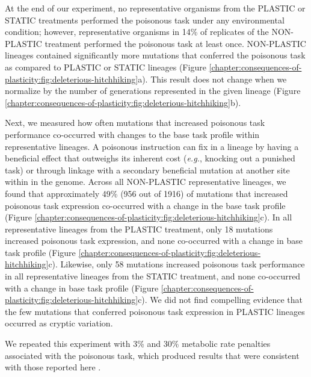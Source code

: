 

\vspace{\baselineskip}
At the end of our experiment, no representative organisms from the PLASTIC or STATIC treatments performed the poisonous task under any environmental condition; however, representative organisms in 14\% of replicates of the NON-PLASTIC treatment performed the poisonous task at least once. 
NON-PLASTIC lineages contained significantly more mutations that conferred the poisonous task as compared to PLASTIC or STATIC lineages (Figure \ref{chapter:consequences-of-plasticity:fig:deleterious-hitchhiking}a).
This result does not change when we normalize by the number of generations represented in the given lineage (Figure \ref{chapter:consequences-of-plasticity:fig:deleterious-hitchhiking}b).

Next, we measured how often mutations that increased poisonous task performance co-occurred with changes to the base task profile within representative lineages.
A poisonous instruction can fix in a lineage by having a beneficial effect that outweighs its inherent cost (\textit{e.g.}, knocking out a punished task) or through linkage with a secondary beneficial mutation at another site within in the genome.
Across all NON-PLASTIC representative lineages, we found that approximately 49\% (956 out of 1916) of mutations that increased poisonous task expression co-occurred with a change in the base task profile (Figure \ref{chapter:consequences-of-plasticity:fig:deleterious-hitchhiking}c).
In all representative lineages from the PLASTIC treatment, only 18 mutations increased poisonous task expression, and none co-occurred with a change in base task profile (Figure \ref{chapter:consequences-of-plasticity:fig:deleterious-hitchhiking}c).
Likewise, only 58 mutations increased poisonous task performance in all representative lineages from the STATIC treatment, and none co-occurred with a change in base task profile (Figure \ref{chapter:consequences-of-plasticity:fig:deleterious-hitchhiking}c).
We did not find compelling evidence that the few mutations that conferred poisonous task expression in PLASTIC lineages occurred as cryptic variation.

We repeated this experiment with 3\% and 30\% metabolic rate penalties associated with the poisonous task, which produced results that were consistent with those reported here \citep{consequences_of_plasticity_supplemental_material_2021}.